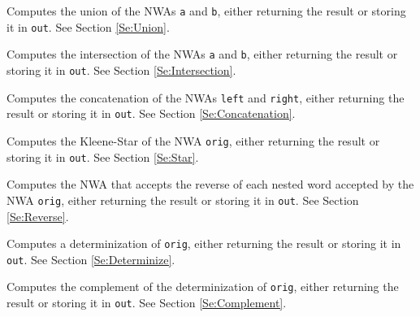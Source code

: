 \begin{functionlist}

    Computes the union of the NWAs \texttt{a} and \texttt{b},
    either returning the result or storing it in \texttt{out}.
    See Section
    \ref{Se:Union}.

    Computes the intersection of the NWAs \texttt{a} and \texttt{b},
    either returning the result or storing it in \texttt{out}.
    See Section \ref{Se:Intersection}.

    Computes the concatenation of the NWAs \texttt{left} and
    \texttt{right}, either returning the result or storing it in
    \texttt{out}.
    See Section \ref{Se:Concatenation}.

    Computes the Kleene-Star of the NWA \texttt{orig}, either
    returning the result or storing it in \texttt{out}. See Section
    \ref{Se:Star}.

    Computes the NWA that accepts the reverse of each nested word
    accepted by the NWA \texttt{orig}, either returning the result or
    storing it in \texttt{out}. See Section \ref{Se:Reverse}.

    Computes a determinization of \texttt{orig}, either returning the
    result or storing it in \texttt{out}.
    See Section \ref{Se:Determinize}.

    Computes the complement of the determinization of \texttt{orig},
    either returning the result or storing it in \texttt{out}.
    See Section
    \ref{Se:Complement}.
\end{functionlist}

